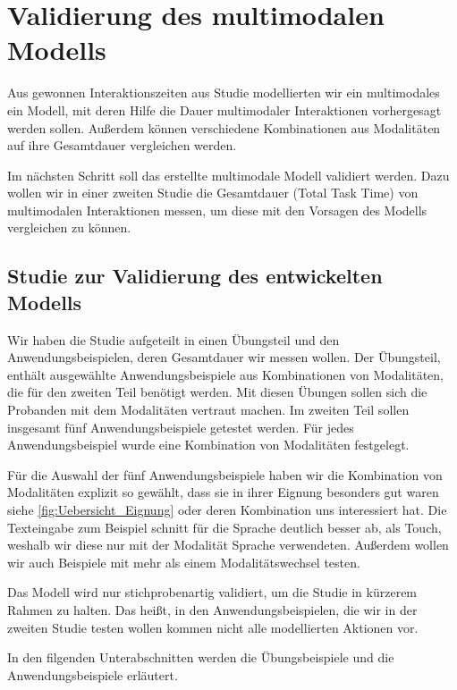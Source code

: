 \chapter[Validierung]{Validierung des multimodalen Modells}\label{cha:Evaluation}
Aus gewonnen Interaktionszeiten aus Studie modellierten wir ein multimodales ein Modell, mit deren Hilfe die Dauer multimodaler Interaktionen vorhergesagt werden sollen.
Außerdem können verschiedene Kombinationen aus Modalitäten auf ihre Gesamtdauer vergleichen werden. 

Im nächsten Schritt soll das erstellte multimodale Modell validiert werden. 
Dazu wollen wir in einer zweiten Studie die Gesamtdauer (Total Task Time) von multimodalen Interaktionen messen, um diese mit den Vorsagen des Modells vergleichen zu können. 

\section[Studie zur Validierung]{Studie zur Validierung des entwickelten Modells}
Wir haben die Studie aufgeteilt in einen Übungsteil und den Anwendungsbeispielen, deren Gesamtdauer wir messen wollen. 
Der Übungsteil, enthält ausgewählte Anwendungsbeispiele aus Kombinationen von Modalitäten, die für den zweiten Teil benötigt werden. 
Mit diesen Übungen sollen sich die Probanden mit dem Modalitäten vertraut machen. 
Im zweiten Teil sollen insgesamt fünf Anwendungsbeispiele getestet werden. Für jedes Anwendungsbeispiel wurde eine Kombination von Modalitäten festgelegt. 

Für die Auswahl der fünf Anwendungsbeispiele haben wir die Kombination von Modalitäten explizit so gewählt, dass sie in ihrer Eignung besonders gut waren siehe \ref{fig:Uebersicht_Eignung} oder deren Kombination uns interessiert hat. Die Texteingabe zum Beispiel schnitt für die Sprache deutlich besser ab, als Touch, weshalb wir diese nur mit der Modalität Sprache verwendeten. Außerdem wollen wir auch Beispiele mit mehr als einem Modalitätswechsel testen. 

Das Modell wird nur stichprobenartig validiert, um die Studie in kürzerem Rahmen zu halten. 
Das heißt, in den Anwendungsbeispielen, die wir in der zweiten Studie testen wollen kommen nicht alle modellierten Aktionen vor. 
  
In den filgenden Unterabschnitten werden die Übungsbeispiele und die Anwendungsbeispiele erläutert.  	
